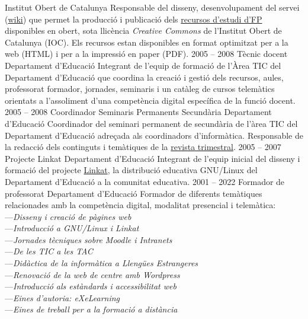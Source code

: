 \documentclass[9pt]{developercv} %
\begin{document}
\begin{entrylist}
	  {Institut Obert de Catalunya}
      {Responsable del disseny, desenvolupament del servei (\href{https://www.dokuwiki.org/dokuwiki}{wiki}) que permet la producció i publicació dels \href{https://ioc.xtec.cat/educacio/recursos}{recursos d'estudi d'FP} disponibles en obert, sota llicència \emph{Creative Commons} de l'Institut Obert de Catalunya (IOC). Els recursos estan disponibles en format optimitzat per a la web (HTML) i per a la impressió en paper (PDF).}
    \entry
      {2005 -- 2008}
      {Tècnic docent}
	  {Departament d'Educació}
      {Integrant de l'equip de formació de l'Àrea TIC del Departament d'Educació que coordina la creació i gestió dels recursos, aules, professorat formador, jornades, seminaris i un catàleg de cursos telemàtics orientats a l'assoliment d'una competència digital específica de la funció docent.}
    \entry
      {2005 -- 2008}
      {Coordinador Seminaris Permanents Secundària}
	  {Departament d'Educació}
      {Coordinador del seminari permanent de secundària de l'àrea TIC del Departament d'Educació adreçada als coordinadors d'informàtica. Responsable de la redacció dels continguts i temàtiques de la \href{http://clic.xtec.cat/qv_web/docs/masterSPS03.pdf}{revista trimestral}.}
   \entry
      {2005 -- 2007}
      {Projecte Linkat}
	  {Departament d'Educació}
      {Integrant de l'equip inicial del disseny i formació del projecte \href{http://linkat.xtec.cat/portal/index.php}{Linkat}, la distribució educativa GNU/Linux del Departament d'Educació a la comunitat educativa.}
   \entry
       {2001 -- 2022}
       {Formador de professorat}
	   {Departament d'Educació}
       {Formador de diferents temàtiques relacionades amb la competència digital, modalitat presencial i telemàtica:\\
         ---\emph{Disseny i creació de pàgines web}\\
         ---\emph{Introducció a GNU/Linux i Linkat}\\
         ---\emph{Jornades tècniques sobre Moodle i Intranets}\\
         ---\emph{De les TIC a les TAC}\\
         ---\emph{Didàctica de la informàtica a Llengües Estrangeres}\\
         ---\emph{Renovació de la web de centre amb Wordpress}\\
         ---\emph{Introducció als estàndards i accessibilitat web}\\
         ---\emph{Eines d'autoria: eXeLearning}\\
         ---\emph{Eines de treball per a la formació a distància}}

\end{entrylist}
\end{document}
